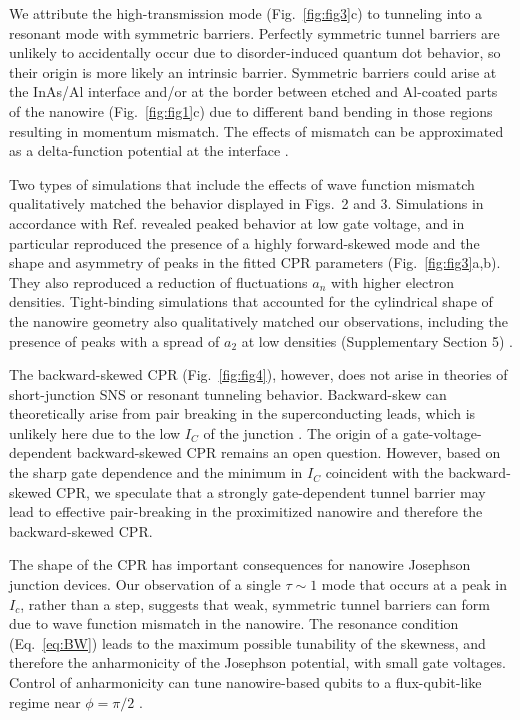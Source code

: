 \documentclass[11pt]{article}
\begin{document}
We attribute the high-transmission mode (Fig.~\ref{fig:fig3}c) to tunneling into a resonant mode with symmetric barriers. Perfectly symmetric tunnel barriers are unlikely to accidentally occur due to disorder-induced quantum dot behavior, so their origin is more likely an intrinsic barrier. Symmetric barriers could arise at the InAs/Al interface and/or at the border between etched and Al-coated parts of the nanowire (Fig.~\ref{fig:fig1}c) due to different band bending in those regions resulting in momentum mismatch. The effects of mismatch can be approximated as a delta-function potential at the interface .

Two types of simulations that include the effects of wave function mismatch qualitatively matched the behavior displayed in Figs.~2 and 3. Simulations in accordance with Ref.  revealed peaked behavior at low gate voltage, and in particular reproduced the presence of a highly forward-skewed mode and the shape and asymmetry of peaks in the fitted CPR parameters (Fig.~\ref{fig:fig3}a,b). They also reproduced a reduction of fluctuations $a_n$ with higher electron densities. Tight-binding simulations that accounted for the cylindrical shape of the nanowire geometry also qualitatively matched our observations, including the presence of peaks with a spread of $a_2$ at low densities (Supplementary Section 5) .

The backward-skewed CPR (Fig.~\ref{fig:fig4}), however, does not arise in theories of short-junction SNS or resonant tunneling behavior. Backward-skew can theoretically arise from pair breaking in the superconducting leads, which is unlikely here due to the low $I_C$ of the junction . The origin of a gate-voltage-dependent backward-skewed CPR remains an open question. However, based on the sharp gate dependence and the minimum in $I_C$ coincident with the backward-skewed CPR, we speculate that a strongly gate-dependent tunnel barrier may lead to effective pair-breaking in the proximitized nanowire and therefore the backward-skewed CPR.

The shape of the CPR has important consequences for nanowire Josephson junction devices. Our observation of a single $\tau \sim 1$ mode that occurs at a peak in $I_c$, rather than a step, suggests that weak, symmetric tunnel barriers can form due to wave function mismatch in the nanowire. The resonance condition (Eq.~\ref{eq:BW}) leads to the maximum possible tunability of the skewness, and therefore the anharmonicity of the Josephson potential, with small gate voltages. Control of  anharmonicity can tune nanowire-based qubits to a flux-qubit-like regime near $\phi = \pi/2$ . 
\end{document}
